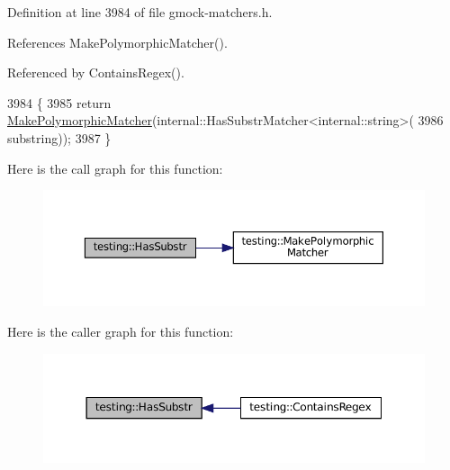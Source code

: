 Definition at line 3984 of file gmock-\/matchers.\+h.



References Make\+Polymorphic\+Matcher().



Referenced by Contains\+Regex().


\begin{DoxyCode}
3984                                                \{
3985   \textcolor{keywordflow}{return} \hyperlink{namespacetesting_a667ca94f190ec2e17ee2fbfdb7d3da04}{MakePolymorphicMatcher}(internal::HasSubstrMatcher<internal::string>(
3986       substring));
3987 \}
\end{DoxyCode}
Here is the call graph for this function\+:
\nopagebreak
\begin{figure}[H]
\begin{center}
\leavevmode
\includegraphics[width=350pt]{namespacetesting_a7d27682e38d57eea81ba145a2772e1c7_cgraph}
\end{center}
\end{figure}
Here is the caller graph for this function\+:
\nopagebreak
\begin{figure}[H]
\begin{center}
\leavevmode
\includegraphics[width=350pt]{namespacetesting_a7d27682e38d57eea81ba145a2772e1c7_icgraph}
\end{center}
\end{figure}
\mbox{\label{namespacetesting_a50ae42540a31047c7fddd32df8d835f5}} 
